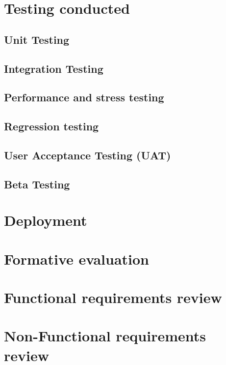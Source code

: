 \section{Testing conducted}


\subsection{Unit Testing}


\subsection{Integration Testing}


\subsection{Performance and stress testing}


\subsection{Regression testing}


\subsection{User Acceptance Testing (UAT)}


\subsection{Beta Testing}


\section{Deployment}


\section{Formative evaluation}


\section{Functional requirements review}


\section{Non-Functional requirements review}